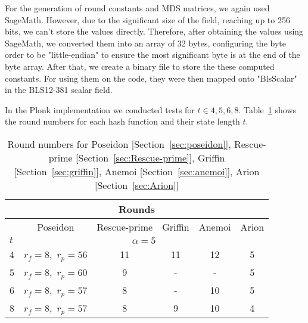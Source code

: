 For the generation of round constants and MDS matrices, we again used SageMath. However, due to the significant size of the field, reaching up to 256 bits, we can't store the values directly. Therefore, after obtaining the values using SageMath, we converted them into an array of 32 bytes, configuring the byte order to be "little-endian" to ensure the most significant byte is at the end of the byte array. After that, we create a binary file to store the these computed constants. For using them on the code, they were then mapped onto "BlsScalar" in the BLS12-381 scalar field.

In the Plonk implementation we conducted tests for $t\in{4,5,6,8}$. Table~\ref{tab:plonk-rounds} shows the round numbers for each hash function and their state length $t$.

\begin{table}[htbp]
  \centering
  \begin{tabular}{@{}cccccclll@{}}
  \toprule
  \multicolumn{9}{c}{Rounds}                                                                                                                                              \\ \midrule
  \multicolumn{1}{l|}{} &
    \multicolumn{1}{c|}{Poseidon} &
    \multicolumn{1}{c|}{Rescue-prime} &
    \multicolumn{1}{c|}{Griffin} &
    \multicolumn{1}{c|}{Anemoi} &
    \multicolumn{4}{c}{Arion} \\ \midrule
  \multicolumn{1}{l|}{$t$} & \multicolumn{8}{c}{$\alpha=5$}                                                                                                               \\ \midrule
  \multicolumn{1}{c|}{4}   & \multicolumn{1}{c|}{$r_f=8,$ $r_p=56$} & \multicolumn{1}{c|}{11} & \multicolumn{1}{c|}{11} & \multicolumn{1}{c|}{12} & \multicolumn{4}{c}{5} \\
  \multicolumn{1}{c|}{5}   & \multicolumn{1}{c|}{$r_f=8,$ $r_p=60$} & \multicolumn{1}{c|}{9}  & \multicolumn{1}{c|}{-}  & \multicolumn{1}{c|}{-}  & \multicolumn{4}{c}{5} \\
  \multicolumn{1}{c|}{6}   & \multicolumn{1}{c|}{$r_f=8,$ $r_p=57$} & \multicolumn{1}{c|}{8}  & \multicolumn{1}{c|}{-}  & \multicolumn{1}{c|}{10} & \multicolumn{4}{c}{5} \\
  \multicolumn{1}{c|}{8}   & \multicolumn{1}{c|}{$r_f=8,$ $r_p=57$} & \multicolumn{1}{c|}{8}  & \multicolumn{1}{c|}{9}  & \multicolumn{1}{c|}{10} & \multicolumn{4}{c}{4} \\ \bottomrule
  \end{tabular}
  \caption{Round numbers for Poseidon [Section~\ref{sec:poseidon}], Rescue-prime [Section~\ref{sec:Rescue-prime}], Griffin [Section~\ref{sec:griffin}], Anemoi [Section~\ref{sec:anemoi}], Arion [Section~\ref{sec:Arion}]}
  \label{tab:plonk-rounds}
  \end{table}


